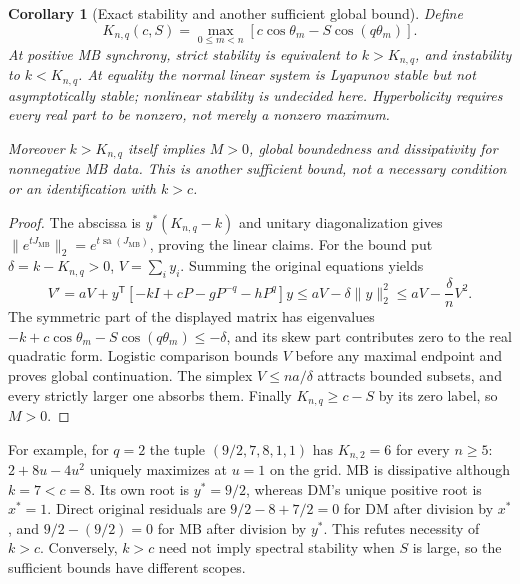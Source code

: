 \documentclass[11pt]{article}
\newcommand{\MB}{\mathrm{MB}}
\DeclareMathOperator{\sa}{sa}
\newtheorem{corollary}[theorem]{Corollary}
\theoremstyle{definition}
\theoremstyle{remark}
\begin{document}
\begin{corollary}[Exact stability and another sufficient global bound]
\label{cor:P08-stability}
Define
\begin{equation}
 K_{n,q}(c,S)=\max_{0\le m<n}[c\cos\theta_m-S\cos(q\theta_m)].
 \label{eq:P08-K}
\end{equation}
At positive MB synchrony, strict stability is equivalent to $k>K_{n,q}$,
and instability to $k<K_{n,q}$. At equality the normal linear system
is Lyapunov stable but not asymptotically stable; nonlinear stability is
undecided here. Hyperbolicity requires every real part to be nonzero,
not merely a nonzero maximum.

Moreover $k>K_{n,q}$ itself implies $M>0$, global boundedness and
dissipativity for nonnegative MB data. This is another sufficient bound,
not a necessary condition or an identification with $k>c$.
\end{corollary}
\begin{proof}
The abscissa is $y^*(K_{n,q}-k)$ and unitary diagonalization gives
$\|e^{tJ_{\MB}}\|_2=e^{t\sa(J_{\MB})}$, proving the linear claims.
For the bound put $\delta=k-K_{n,q}>0$, $V=\sum_i y_i$. Summing the
original equations yields
\begin{equation}
 V'=aV+y^{\mathsf T}[-kI+cP-gP^{-q}-hP^q]y
 \le aV-\delta\|y\|_2^2\le aV-\frac\delta nV^2.
 \label{eq:P08-sum}
\end{equation}
The symmetric part of the displayed matrix has eigenvalues
$-k+c\cos\theta_m-S\cos(q\theta_m)\le-\delta$, and its skew part
contributes zero to the real quadratic form. Logistic comparison bounds
$V$ before any maximal endpoint and proves global continuation.
The simplex $V\le na/\delta$ attracts bounded subsets, and every
strictly larger one absorbs them. Finally $K_{n,q}\ge c-S$ by its
zero label, so $M>0$.
\end{proof}
For example, for $q=2$ the tuple $(9/2,7,8,1,1)$ has $K_{n,2}=6$
for every $n\ge5$: $2+8u-4u^2$ uniquely maximizes at $u=1$ on the
grid. MB is dissipative although $k=7<c=8$. Its own root is $y^*=9/2$,
whereas DM's unique positive root is $x^*=1$. Direct original residuals
are $9/2-8+7/2=0$ for DM after division by $x^*$, and
$9/2-(9/2)=0$ for MB after division by $y^*$. This refutes necessity
of $k>c$. Conversely, $k>c$ need not imply spectral stability when
$S$ is large, so the sufficient bounds have different scopes.
\end{document}
